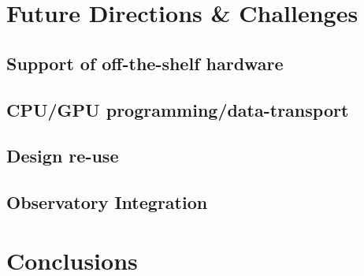 \documentclass{ws-jai}
\begin{document}
\section{Future Directions \& Challenges} \label{sec:Future}

\subsection{Support of off-the-shelf hardware}

\subsection{CPU/GPU programming/data-transport}

\subsection{Design re-use}

\subsection{Observatory Integration}


\section{Conclusions} \label{sec:Conclusions}


 
\end{document}
